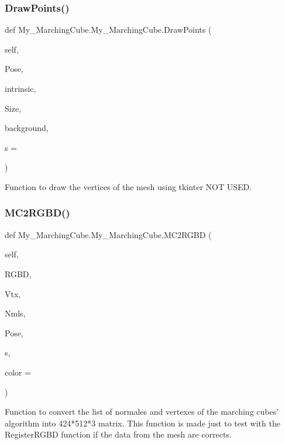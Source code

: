\subsubsection{Draw\+Points()}
{\footnotesize\ttfamily def My\+\_\+\+Marching\+Cube.\+My\+\_\+\+Marching\+Cube.\+Draw\+Points (\begin{DoxyParamCaption}\item[{}]{self,  }\item[{}]{Pose,  }\item[{}]{intrinsic,  }\item[{}]{Size,  }\item[{}]{background,  }\item[{}]{s = {} }\end{DoxyParamCaption})}

\begin{DoxyVerb}    Function to draw the vertices of the mesh using tkinter
    NOT USED.
\end{DoxyVerb}
 \mbox{\label{class_my___marching_cube_1_1_my___marching_cube_aaf418aa2b8358d872fc53616408acdf6}} 
\subsubsection{M\+C2\+R\+G\+B\+D()}
{\footnotesize\ttfamily def My\+\_\+\+Marching\+Cube.\+My\+\_\+\+Marching\+Cube.\+M\+C2\+R\+G\+BD (\begin{DoxyParamCaption}\item[{}]{self,  }\item[{}]{R\+G\+BD,  }\item[{}]{Vtx,  }\item[{}]{Nmls,  }\item[{}]{Pose,  }\item[{}]{s,  }\item[{}]{color = {} }\end{DoxyParamCaption})}

\begin{DoxyVerb}    Function to convert the list of normales and vertexes of the marching cubes' algorithm into
    424*512*3 matrix.
    This function is made just to test with the RegisterRGBD function if the data from the mesh are corrects.
\end{DoxyVerb}
 \mbox{\label{class_my___marching_cube_1_1_my___marching_cube_a234beb0a06a023ee9d4571d569af755c}} 
